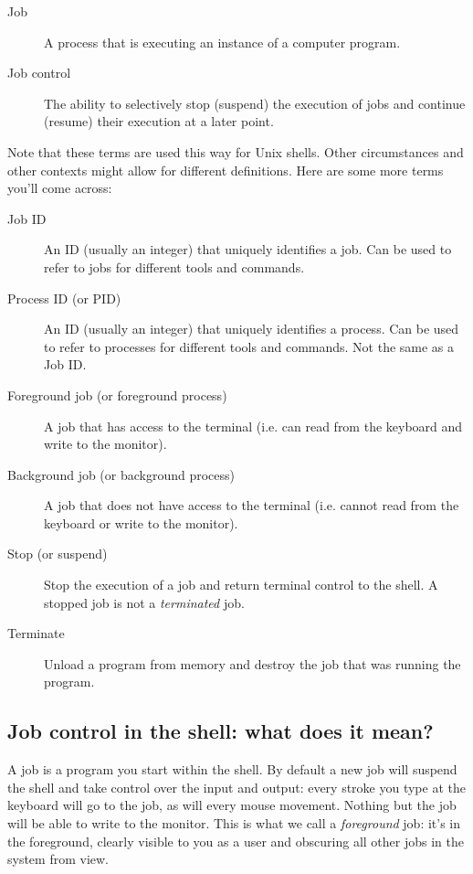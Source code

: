 \begin{description}
\item[Job] A process that is executing an instance of a computer program.
\item[Job control] The ability to selectively stop (suspend) the execution of jobs and continue (resume) their execution at a later point.
\end{description}

Note that these terms are used this way for Unix shells. Other circumstances
and other contexts might allow for different definitions. Here are some more
terms you'll come across:

\begin{description}
\item[Job ID] An ID (usually an integer) that uniquely identifies a job. Can be used to refer to jobs for different tools and commands.
\item[Process ID (or PID)] An ID (usually an integer) that uniquely identifies a process. Can be used to refer to processes for different tools and commands. Not the same as a Job ID.
\item[Foreground job (or foreground process)] A job that has access to the terminal (i.e. can read from the keyboard and write to the monitor).
\item[Background job (or background process)] A job that does not have access to the terminal (i.e. cannot read from the keyboard or write to the monitor).
\item[Stop (or suspend)] Stop the execution of a job and return terminal control to the shell. A stopped job is not a \textit{terminated} job.
\item[Terminate] Unload a program from memory and destroy the job that was running the program.
\end{description}

\subsection{Job control in the shell: what does it mean?}
A job is a program you start within the shell. By default a new job will
suspend the shell and take control over the input and output: every stroke you
type at the keyboard will go to the job, as will every mouse movement. Nothing
but the job will be able to write to the monitor. This is what we call a
\textit{foreground} job: it's in the foreground, clearly visible to you as a
user and obscuring all other jobs in the system from view.

